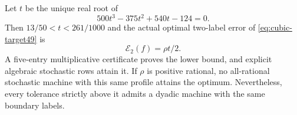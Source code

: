 \begin{theorem}\label{thm:cubic49}
Let $t$ be the unique real root of
\begin{equation}\label{eq:cubic49}
 500t^3-375t^2+540t-124=0.
\end{equation}
Then $13/50<t<261/1000$ and the actual optimal two-label error of
\eqref{eq:cubic-target49} is
\begin{equation}\label{eq:cubic-opt49}
 \mathcal E_2(f)=\rho t/2.
\end{equation}
A five-entry multiplicative certificate proves the lower bound, and
explicit algebraic stochastic rows attain it. If $\rho$ is positive
rational, no all-rational stochastic machine with this same profile
attains the optimum. Nevertheless, every tolerance strictly above it
admits a dyadic machine with the same boundary labels.
\end{theorem}
